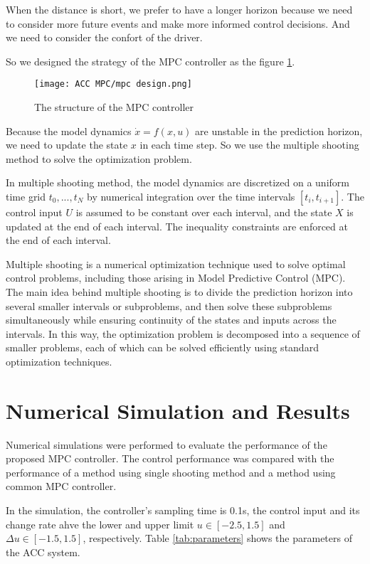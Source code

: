 \documentclass{article}
\numberwithin{equation}{section}
\begin{document}
When the distance is short, we prefer to have a longer horizon because we need
to consider more future events and make more informed control decisions. And we
need to consider the confort of the driver.

So we designed the strategy of the MPC controller as the figure
\ref{fig:mpc_design}.
\begin{figure}[h!]
    \centering
    \texttt{[image: ACC MPC/mpc design.png]}
    \caption{The structure of the MPC controller}
    \label{fig:mpc_design}
\end{figure}

Because the model dynamics $\dot{x}=f(x,u)$ are unstable in the prediction
horizon, we need to update the state $x$ in each time step. So we use the
multiple shooting method to solve the optimization problem.

In multiple shooting method, the model dynamics are discretized on a uniform
time grid $t_0, ..., t_N$ by numerical integration over the time intervals
$[t_i, t_{i+1}]$. The control input $U$ is assumed to be constant over each
interval, and the state $X$ is updated at the end of each interval. The
inequality constraints are enforced at the end of each interval.

Multiple shooting is a numerical optimization technique used to solve optimal
control problems, including those arising in Model Predictive Control (MPC).
The main idea behind multiple shooting is to divide the prediction horizon into
several smaller intervals or subproblems, and then solve these subproblems
simultaneously while ensuring continuity of the states and inputs across the
intervals. In this way, the optimization problem is decomposed into a sequence
of smaller problems, each of which can be solved efficiently using standard
optimization techniques.

\section{Numerical Simulation and Results}

Numerical simulations were performed to evaluate the performance of the
proposed MPC controller. The control performance was compared with the
performance of a method using single shooting method and a method using common
MPC controller.

In the simulation, the controller's sampling time is 0.1s, the control input
and its change rate ahve the lower and upper limit $u \in [-2.5,1.5]$ and
$\Delta u \in [-1.5,1.5]$, respectively. Table \ref{tab:parameters} shows the
parameters of the ACC system.
\end{document}
